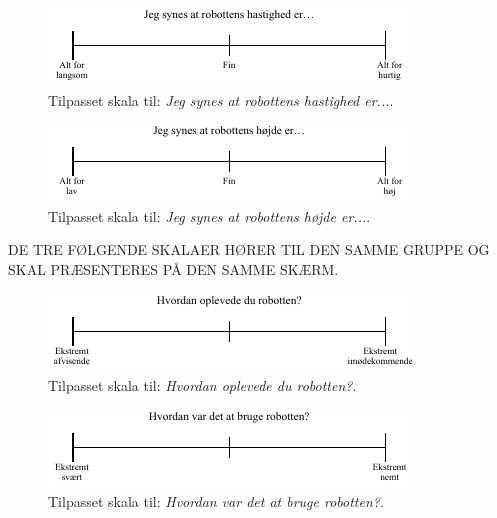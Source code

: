 %
\begin{figure}[H]
\centering
\includegraphics[width =\textwidth]{Figure/TilpasningAfSkalaer/TilpassetHastighedR} 
\caption{Tilpasset skala til: \textit{Jeg synes at robottens hastighed er...}.}
\label{fig:TilpasningHastighedR}
\end{figure}
\noindent
%
%
\begin{figure}[H]
\centering
\includegraphics[width =\textwidth]{Figure/TilpasningAfSkalaer/TilpassetHoejdeR} 
\caption{Tilpasset skala til: \textit{Jeg synes at robottens højde er...}.}
\label{fig:TilpasningHoejdeR}
\end{figure}
\noindent
%
DE TRE FØLGENDE SKALAER HØRER TIL DEN SAMME GRUPPE OG SKAL PRÆSENTERES PÅ DEN SAMME SKÆRM.
%
\begin{figure}[H]
\centering
\includegraphics[width =\textwidth]{Figure/TilpasningAfSkalaer/TilpassetOplevede} 
\caption{Tilpasset skala til: \textit{Hvordan oplevede du robotten?}.}
\label{fig:TilpasningOplevede}
\end{figure}
\noindent
%
%
\begin{figure}[H]
\centering
\includegraphics[width =\textwidth]{Figure/TilpasningAfSkalaer/TilpassetHvordanVarDetAtBrugeR} 
\caption{Tilpasset skala til: \textit{Hvordan var det at bruge robotten?}.}
\label{fig:TilpasningBrugAfR}
\end{figure}
